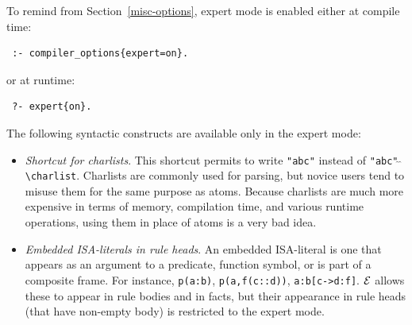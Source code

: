 \documentclass[11pt]{article}
\newcommand{\ERGO}{\mbox{\ensuremath{\cal{E}}\smaller{{\sc{RGO}}}}\xspace}
\newcommand{\FLSYSTEM}{\ERGO}
\newcommand{\bs}{\textbackslash}
\begin{document}
To remind from Section~\ref{misc-options}, expert mode is enabled either at
compile time:
\begin{verbatim}
 :- compiler_options{expert=on}. 
\end{verbatim}
or at runtime:
\begin{verbatim}
 ?- expert{on}. 
\end{verbatim}

\noindent
The following syntactic constructs are available only in the expert mode:
\begin{itemize}
\item  \emph{Shortcut for charlists}.
  This shortcut permits to write \texttt{"abc"} instead of
  \texttt{"abc"$\hat{~}\hat{~}$\bs{}charlist}. Charlists are commonly used
  for parsing, but novice users tend to misuse them for the same purpose as
  atoms.  Because charlists are much more expensive in terms of memory,
  compilation time, and various runtime operations, using them in place of
  atoms is a very bad idea.
\item  \emph{Embedded ISA-literals in rule heads}.
   An embedded ISA-literal is one that appears as an argument to a
   predicate, function symbol, or is part of a composite frame. For instance,
   \texttt{p(a:b)}, \texttt{p(a,f(c::d))}, \texttt{a:b[c->d:f]}.
   \FLSYSTEM allows these to appear in rule bodies and in facts, but their
   appearance in rule heads (that have non-empty body) is restricted to the
   expert mode.


\end{itemize}
\end{document}
